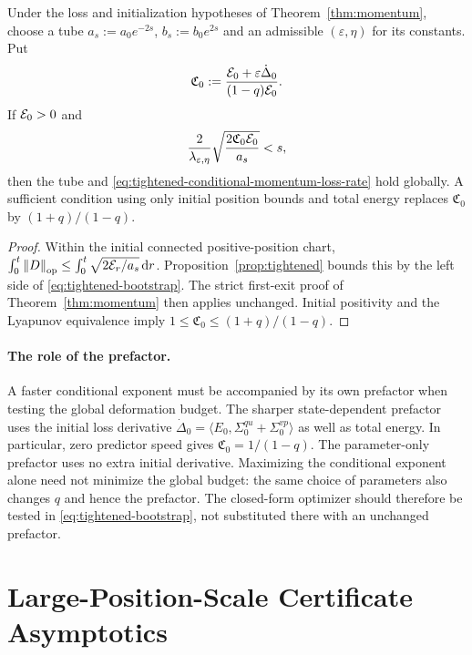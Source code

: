 \begin{corollary}
\label{cor:tightened-bootstrap}
Under the loss and initialization hypotheses of Theorem~\ref{thm:momentum},
choose a tube $a_s:=a_0e^{-2s}$, $b_s:=b_0e^{2s}$ and an admissible
$(\varepsilon,\eta)$ for its constants. Put
\[
 \mathfrak C_0:=\frac{\mathcal E_0+\varepsilon\dot\Delta_0}{(1-q)\mathcal E_0}.
\]
If $\mathcal E_0>0$ and
\begin{equation}\label{eq:tightened-bootstrap}
 \frac2{\lambda_{\varepsilon,\eta}}
 \sqrt{\frac{2\mathfrak C_0\mathcal E_0}{a_s}}<s,
\end{equation}
then the tube and \eqref{eq:tightened-conditional-momentum-loss-rate} hold globally.
A sufficient condition using only initial position bounds and total
energy replaces $\mathfrak C_0$ by $(1+q)/(1-q)$.
\end{corollary}
\begin{proof}
Within the initial connected positive-position chart,
$\int_0^t\left\lVert D \right\rVert_{\mathrm{op}}\le\int_0^t\sqrt{2\mathcal E_r/a_s}\,\mathrm{d} r$.
Proposition~\ref{prop:tightened} bounds this by the left side of
\eqref{eq:tightened-bootstrap}. The strict first-exit proof of
Theorem~\ref{thm:momentum} then applies unchanged. Initial positivity and
the Lyapunov equivalence imply $1\le \mathfrak C_0\le(1+q)/(1-q)$.
\end{proof}

\paragraph{The role of the prefactor.}
A faster conditional exponent must be accompanied by its own prefactor
when testing the global deformation budget.
The sharper state-dependent prefactor uses the initial loss derivative
$\dot\Delta_0=\langle E_0,\Sigma^{qu}_0+\Sigma^{vp}_0\rangle$
as well as total energy. In particular, zero predictor speed gives
$\mathfrak C_0=1/(1-q)$. The parameter-only prefactor uses no extra initial derivative.
Maximizing the conditional exponent alone need not minimize the global
budget: the same choice of parameters also changes $q$ and hence the
prefactor. The closed-form optimizer should therefore be tested in
\eqref{eq:tightened-bootstrap}, not substituted there with an unchanged
prefactor.

\section{Large-Position-Scale Certificate Asymptotics}
\label{app:large-position-scale-certificate}\label{app:large-position-scale}
\label{subsec:large-position-scale-certificate}

